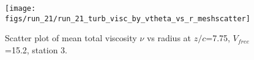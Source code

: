 \begin{figure}[H]
\centering
\texttt{[image: figs/run\_21/run\_21\_turb\_visc\_by\_vtheta\_vs\_r\_meshscatter]}
\caption{Scatter plot of mean total viscosity $\nu$ vs radius at $z/c$=7.75, $V_{free}$=15.2, station 3.}
\label{fig:run_21_turb_visc_by_vtheta_vs_r_meshscatter}
\end{figure}


